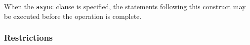 
%



When the {\tt async} clause is specified, the statements following this
construct may be executed before the operation is complete.

\subsubsection*{Restrictions}

